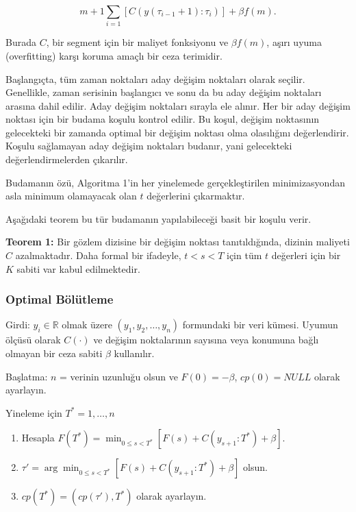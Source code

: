 \documentclass[12pt,twoside]{deuthesis}
\begin{document}
\[ m+1 \sum_{i=1} [C(y(\tau_{i-1}+1):\tau_i)] + \beta f (m). \]

Burada \(C\), bir segment için bir maliyet fonksiyonu ve \(\beta f(m)\), aşırı uyuma (overfitting) karşı koruma amaçlı bir ceza terimidir.

Başlangıçta, tüm zaman noktaları aday değişim noktaları olarak seçilir. Genellikle, zaman serisinin başlangıcı ve sonu da bu aday değişim noktaları arasına dahil edilir. Aday değişim noktaları sırayla ele alınır. Her bir aday değişim noktası için bir budama koşulu kontrol edilir. Bu koşul, değişim noktasının gelecekteki bir zamanda optimal bir değişim noktası olma olasılığını değerlendirir. Koşulu sağlamayan aday değişim noktaları budanır, yani gelecekteki değerlendirmelerden çıkarılır.

Budamanın özü, Algoritma 1'in her yinelemede gerçekleştirilen minimizasyondan asla minimum olamayacak olan \(t\) değerlerini çıkarmaktır.

Aşağıdaki teorem bu tür budamanın yapılabileceği basit bir koşulu verir.

\textbf{Teorem 1:} Bir gözlem dizisine bir değişim noktası tanıtıldığında, dizinin maliyeti \(C\) azalmaktadır. Daha formal bir ifadeyle, \(t < s < T\) için tüm \(t\) değerleri için bir \(K\) sabiti var kabul edilmektedir.

\hypertarget{optimal-buxf6luxfctleme}{%
\subsubsection{Optimal Bölütleme}\label{optimal-buxf6luxfctleme}}

Girdi: \(y_i \in \mathbb{R}\) olmak üzere \((y_1, y_2, \ldots, y_n)\) formundaki bir veri kümesi. Uyumun ölçüsü olarak \(C(\cdot)\) ve değişim noktalarının sayısına veya konumuna bağlı olmayan bir ceza sabiti \(\beta\) kullanılır.

Başlatma: \(n\) = verinin uzunluğu olsun ve \(F(0) = -\beta\), \(cp(0) = NULL\) olarak ayarlayın.

Yineleme için \(T^* = 1, \ldots, n\)

\begin{enumerate}
\def\labelenumi{\arabic{enumi}.}
\item
  Hesapla \(F(T^*) = \min_{0 \leq s < T^*} [F(s) + C(y_{s+1}:T^*) + \beta]\).
\item
  \(\tau' = \arg \min_{0 \leq s < T^*} [F(s) + C(y_{s+1}:T^*) + \beta]\) olsun.
\item
  \(cp(T^*) = (cp(\tau'), T^*)\) olarak ayarlayın.
\end{enumerate}
\end{document}
